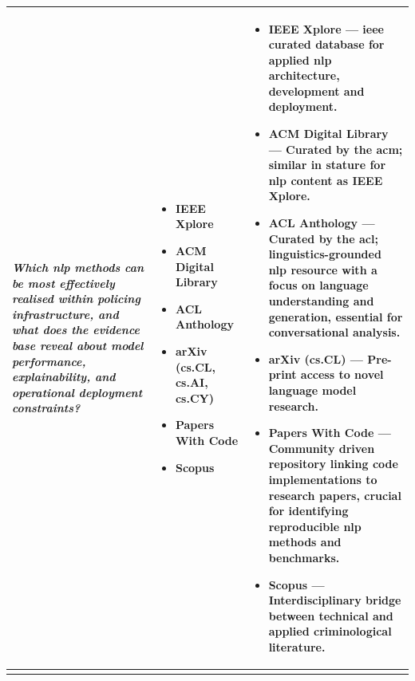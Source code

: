 \begin{longtable}{%
  >{\centering\arraybackslash}p{4.4cm}%
  >{\centering\arraybackslash}p{2.6cm}%
  >{\centering\arraybackslash}p{7.7cm}%
}
\textit{Which \gls{nlp} methods can be most effectively realised within policing
infrastructure, and what does the evidence base reveal about model performance,
explainability, and operational deployment constraints?} &
%
\begin{itemize}[leftmargin=*,nosep,topsep=2pt,partopsep=0pt,itemindent=0pt,align=left]
  \item IEEE Xplore
  \item ACM Digital Library
  \item ACL Anthology
  \item arXiv (cs.CL, cs.AI, cs.CY)
  \item Papers With Code
  \item Scopus
\end{itemize} &
%
\begin{itemize}[leftmargin=*,nosep,topsep=2pt,partopsep=0pt,itemindent=0pt,align=left]
  \item \textbf{IEEE Xplore} --- \gls{ieee} curated database for applied \gls{nlp} architecture, development and deployment.
  \item \textbf{ACM Digital Library} --- Curated by the \gls{acm}; similar in stature for \gls{nlp} content as \textbf{IEEE Xplore}.
  \item \textbf{ACL Anthology} --- Curated by the \gls{acl}; linguistics-grounded \gls{nlp} resource with a focus on language understanding and generation, essential for conversational analysis.
  \item \textbf{arXiv} (cs.CL) --- Pre-print access to novel language model research.
  \item \textbf{Papers With Code} --- Community driven repository linking code implementations to research papers, crucial for identifying reproducible \gls{nlp} methods and benchmarks.
  \item \textbf{Scopus} --- Interdisciplinary bridge between technical and applied criminological literature.
\end{itemize} \\[8pt]

\midrule


\multicolumn{3}{c}{%
  \cellcolor{track3lt}\textcolor{track3}{%
    \textbf{Track 3 \textemdash{} Organisational Structures \& Policing}}}\\[2pt]


\end{longtable}
